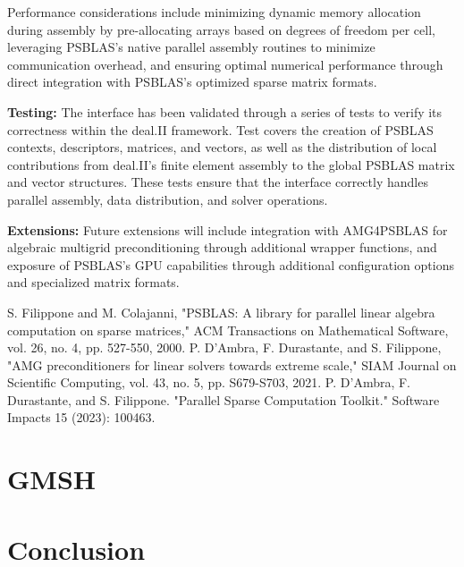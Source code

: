 \documentclass[a4paper,12pt]{article}
\begin{document}
Performance considerations include minimizing dynamic memory allocation 
during assembly by pre-allocating arrays based on degrees of freedom per cell, 
leveraging PSBLAS's native parallel assembly routines to minimize communication 
overhead, and ensuring optimal numerical performance through direct 
integration with PSBLAS's optimized sparse matrix formats.

\textbf{Testing:} The interface has been validated through a series of tests
to verify its correctness within the deal.II framework. Test covers the creation of PSBLAS contexts,
descriptors, matrices, and vectors, as well as the distribution of local contributions
from deal.II's finite element assembly to the global PSBLAS matrix and vector structures.
These tests ensure that the interface correctly handles parallel assembly,
data distribution, and solver operations.

\textbf{Extensions:} Future extensions will include integration with AMG4PSBLAS for algebraic multigrid 
preconditioning through additional wrapper functions, and exposure of PSBLAS's GPU capabilities through 
additional configuration options and specialized matrix formats.


\begin{thebibliography}{10}
     S. Filippone and M. Colajanni, "PSBLAS: A library for parallel linear algebra computation on sparse matrices," ACM Transactions on Mathematical Software, vol. 26, no. 4, pp. 527-550, 2000.
     P. D'Ambra, F. Durastante, and S. Filippone, "AMG preconditioners for linear solvers towards extreme scale," SIAM Journal on Scientific Computing, vol. 43, no. 5, pp. S679-S703, 2021.
     P. D’Ambra, F. Durastante, and S. Filippone. "Parallel Sparse Computation Toolkit." Software Impacts 15 (2023): 100463.
\end{thebibliography}

\newpage

\section{GMSH}
\label{sec:section4}

\lipsum[12-13]

\newpage

\section{{Conclusion}} \label{sec:conclusion}

\lipsum[20]

\label{MyLastPage}
\end{document}
